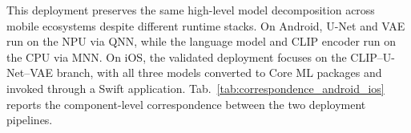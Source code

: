 This deployment preserves the same high-level model decomposition across mobile ecosystems despite different runtime stacks. On Android, U-Net and VAE run on the NPU via QNN, while the language model and CLIP encoder run on the CPU via MNN. On iOS, the validated deployment focuses on the CLIP--U-Net--VAE branch, with all three models converted to Core ML packages and invoked through a Swift application. Tab.~\ref{tab:correspondence_android_ios} reports the component-level correspondence between the two deployment pipelines.

